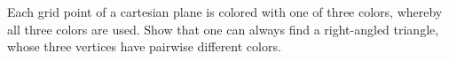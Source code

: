 \begin{problem}
    Each grid point of a cartesian plane is colored with one of three colors, whereby all three colors are used. Show that one can always find a right-angled triangle, whose three vertices have pairwise different colors.
    \label{04RUS91}
\end{problem}